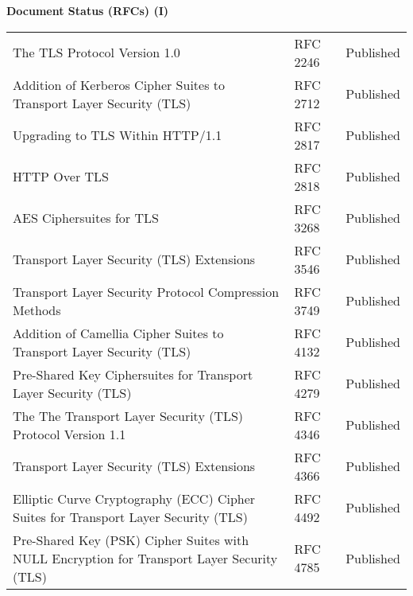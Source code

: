 \documentclass[helvetica]{seminar}
\newcommand{\heading}[1]{%
  \begin{center} 
    \large\bf 
    #1 
  \end{center} 
  \vspace{.4 in}}
\begin{document}
\begin{slide}
\heading{Document Status (RFCs) (I)}

{\tiny
\begin{tabular}{|p{1.5 in}|p{1.4 in}|p{.7 in}|}
\hline
The TLS Protocol Version 1.0  & RFC 2246 & Published \\
Addition of Kerberos Cipher Suites to Transport Layer Security (TLS)  & RFC 2712 & Published \\
Upgrading to TLS Within HTTP/1.1  & RFC 2817 & Published \\
HTTP Over TLS  & RFC 2818 & Published \\
AES Ciphersuites for TLS  & RFC 3268 & Published \\
Transport Layer Security (TLS) Extensions  & RFC 3546 & Published \\
Transport Layer Security Protocol Compression Methods  & RFC 3749 & Published \\
Addition of Camellia Cipher Suites to Transport Layer Security (TLS)  & RFC 4132 & Published \\
Pre-Shared Key Ciphersuites for Transport Layer Security (TLS)  & RFC 4279 & Published \\
The The Transport Layer Security (TLS) Protocol Version 1.1  & RFC 4346 & Published \\
Transport Layer Security (TLS) Extensions  & RFC 4366 & Published \\
Elliptic Curve Cryptography (ECC) Cipher Suites for Transport Layer Security (TLS)  & RFC 4492 & Published \\
Pre-Shared Key (PSK) Cipher Suites with NULL Encryption for Transport Layer Security (TLS)  & RFC 4785 & Published \\
\hline
\end{tabular}
}
\end{slide}
\end{document}
